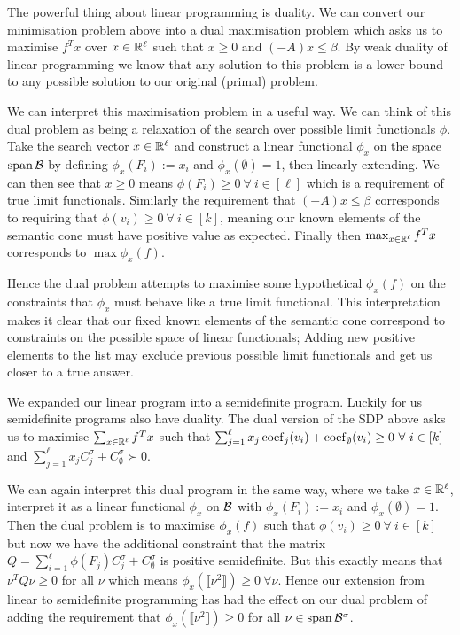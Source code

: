 The powerful thing about linear programming is duality. We can convert our minimisation
problem above into a dual maximisation problem which asks us to maximise
$f^Tx$ over $x \in \mathbb{R}^\ell$ such that $x \geq 0$ and $(-A)x \leq \beta$.
By weak duality of linear programming
we know that any solution to this problem is a lower bound to any possible solution to
our original (primal) problem.

We can interpret this maximisation problem in a useful way. We can think of this dual
problem as being a relaxation of the search over possible limit functionals $\phi$.
Take the search vector $x\in\mathbb{R}^\ell$ and construct a linear functional $\phi_x$ on the
space $\operatorname{span}\mathcal{B}$ by defining $\phi_x(F_i) := x_i$ and $\phi_x(\emptyset) = 1$, then
linearly extending. We can then see that $x \geq 0$ means $\phi(F_i) \geq 0\ \forall\ i \in[\ell]$
which is a requirement of true limit functionals. Similarly the requirement
that $(-A)x \leq \beta$ corresponds to requiring that $\phi(v_i) \geq 0\ \forall\ i\in[k]$,
meaning our known elements of the semantic cone must have positive value as expected.
Finally then $\max_{x\in\mathbb{R}^\ell} f^Tx$ corresponds to $\max \phi_x(f)$.

Hence the dual problem attempts to maximise some hypothetical $\phi_x(f)$ on the
constraints that $\phi_x$ must behave like a true limit functional. This interpretation
makes it clear that our fixed known elements of the semantic cone correspond to constraints
on the possible space of linear functionals; Adding new positive elements to the list
may exclude previous possible limit functionals and get us closer to a true answer.

We expanded our linear program into a semidefinite program. Luckily for us semidefinite
programs also have duality. The dual version of the SDP above asks us to
maximise $\sum_{x\in\mathbb{R}^\ell}f^Tx$ such that
$\sum_{j=1}^\ell x_j\operatorname{coef}_j(v_i) + \operatorname{coef}_\emptyset(v_i) \geq 0\ \forall\ i\in[k]$ and
$\sum_{j=1}^\ell x_jC_j^\sigma + C_\emptyset^\sigma \succ 0$.

We can again interpret this dual program in the same way, where we take $x\in\mathbb{R}^\ell$,
interpret it as a linear functional $\phi_x$ on $\mathcal{B}$ with $\phi_x(F_i) := x_i$ and
$\phi_x(\emptyset)=1$. Then the dual problem is to maximise $\phi_x(f)$ such that
$\phi(v_i) \geq 0\ \forall\ i\in[k]$ but now we have the additional constraint that
the matrix $Q = \sum_{i=1}^\ell\phi(F_j)C_j^\sigma + C_\emptyset^\sigma$ is positive semidefinite.
But this exactly means that $\nu^T Q \nu \geq 0$ for all $\nu$ which means
$\phi_x(\llbracket \nu^2 \rrbracket) \geq 0\ \forall \nu$. Hence our extension from linear
to semidefinite programming has had the effect on our dual problem of adding the
requirement that $\phi_x(\llbracket \nu^2 \rrbracket) \geq 0$ for all $\nu\in\operatorname{span}\mathcal{B}^\sigma$.

